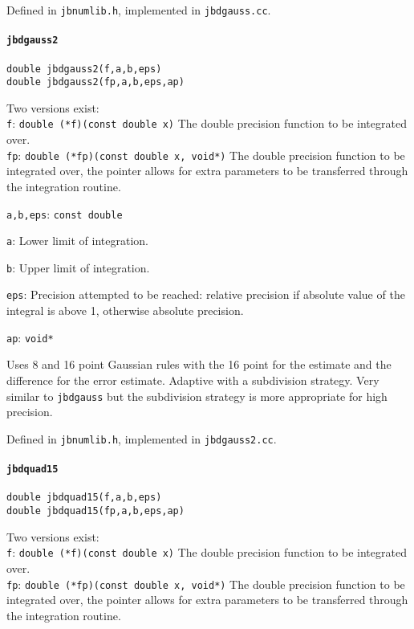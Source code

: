 \documentclass[12pt,a4paper]{article}
\newcommand{\mytt}[1]{\texttt{#1}}
\newcommand{\newfunction}[1]{\mytt{#1}\index{\mytt{#1}}}
\begin{document}
Defined in \mytt{jbnumlib.h}, implemented in \mytt{jbdgauss.cc}.

\paragraph{\newfunction{jbdgauss2}}

\mytt{double jbdgauss2(f,a,b,eps)}\\
\mytt{double jbdgauss2(fp,a,b,eps,ap)}

Two versions exist:\\
\mytt{f}: \mytt{double (*f)(const double x)} The double precision
function to be integrated over.\\
\mytt{fp}: \mytt{double (*fp)(const double x, void*)} The double precision
function to be integrated over, the pointer allows for extra parameters
to be transferred through the integration routine.

\mytt{a,b,eps}: \mytt{const double}

\mytt{a}: Lower limit of integration.

\mytt{b}: Upper limit of integration.

\mytt{eps}: Precision attempted to be reached: relative precision if absolute
value of the integral is above 1, otherwise absolute precision.

\mytt{ap}: \mytt{void*}

Uses 8 and 16 point Gaussian rules with the 16 point for the estimate
and the difference for the error estimate. Adaptive with a subdivision strategy.
Very similar to \mytt{jbdgauss} but the subdivision strategy is more
appropriate for high precision.

Defined in \mytt{jbnumlib.h}, implemented in \mytt{jbdgauss2.cc}.

\paragraph{\newfunction{jbdquad15}}

\mytt{double jbdquad15(f,a,b,eps)}\\
\mytt{double jbdquad15(fp,a,b,eps,ap)}

Two versions exist:\\
\mytt{f}: \mytt{double (*f)(const double x)} The double precision
function to be integrated over.\\
\mytt{fp}: \mytt{double (*fp)(const double x, void*)} The double precision
function to be integrated over, the pointer allows for extra parameters
to be transferred through the integration routine.
\end{document}
